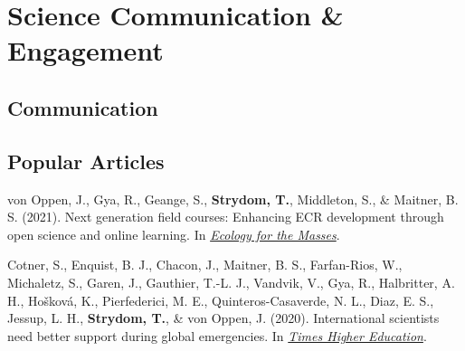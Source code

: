 \documentclass[11pt, a4paper]{awesome-cv}
\begin{document}
\begin{cventries}
\end{cventries}

\hypertarget{science-communication-engagement}{%
\section{Science Communication \&
Engagement}\label{science-communication-engagement}}

\vspace{\baselineskip}

\hypertarget{communication}{%
\subsection{\texorpdfstring{\textbf{Communication}}{Communication}}\label{communication}}

\begin{cventries}
    \vspace{-4.0mm}
\end{cventries}
\vspace{\baselineskip}

\hypertarget{popular-articles}{%
\subsection{\texorpdfstring{\textbf{Popular
Articles}}{Popular Articles}}\label{popular-articles}}

\begingroup
\setlength{\parindent}{-0.5in}
\setlength{\leftskip}{0.5in}

\hypertarget{refs_popular}{}
\leavevmode\hypertarget{ref-NextGen2021}{}%
von Oppen, J., Gya, R., Geange, S., \textbf{Strydom, T.}, Middleton, S.,
\& Maitner, B. S. (2021). Next generation field courses: Enhancing ECR
development through open science and online learning. In
\emph{\href{https://ecologyforthemasses.com/2021/03/08/next-generation-field-courses-enhancing-ecr-development-through-open-science-and-online-learning/}{Ecology
for the Masses}}.

\leavevmode\hypertarget{ref-peru2020}{}%
Cotner, S., Enquist, B. J., Chacon, J., Maitner, B. S., Farfan-Rios, W.,
Michaletz, S., Garen, J., Gauthier, T.-L. J., Vandvik, V., Gya, R.,
Halbritter, A. H., Hošková, K., Pierfederici, M. E.,
Quinteros-Casaverde, N. L., Diaz, E. S., Jessup, L. H.,
\textbf{Strydom, T.}, \& von Oppen, J. (2020). International scientists
need better support during global emergencies. In
\emph{\href{https://tinyurl.com/y5ccw9nb}{Times Higher Education}}.
\end{document}
